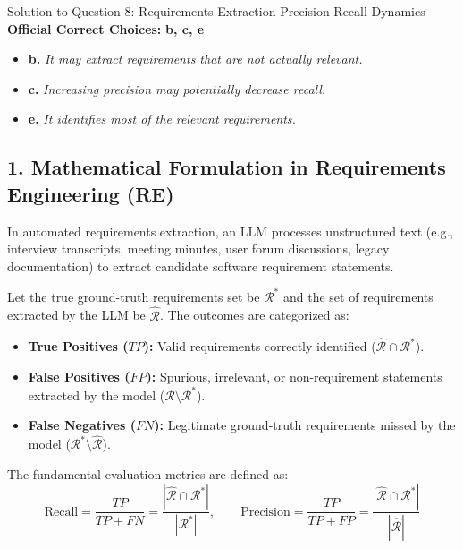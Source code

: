 \documentclass[11pt,a4paper]{article}
\begin{document}
\begin{solutionbox}{Solution to Question 8: Requirements Extraction Precision-Recall Dynamics}
\textbf{Official Correct Choices:} \textbf{b, c, e}
\begin{itemize}[leftmargin=2em,itemsep=1pt]
    \item \textbf{b.} \textit{It may extract requirements that are not actually relevant.}
    \item \textbf{c.} \textit{Increasing precision may potentially decrease recall.}
    \item \textbf{e.} \textit{It identifies most of the relevant requirements.}
\end{itemize}

\medskip
\subsection*{1. Mathematical Formulation in Requirements Engineering (RE)}
In automated requirements extraction, an LLM processes unstructured text (e.g., interview transcripts, meeting minutes, user forum discussions, legacy documentation) to extract candidate software requirement statements.

Let the true ground-truth requirements set be $\mathcal{R}^*$ and the set of requirements extracted by the LLM be $\hat{\mathcal{R}}$. The outcomes are categorized as:
\begin{itemize}[leftmargin=1.5em,itemsep=1pt]
    \item \textbf{True Positives ($TP$):} Valid requirements correctly identified ($\hat{\mathcal{R}} \cap \mathcal{R}^*$).
    \item \textbf{False Positives ($FP$):} Spurious, irrelevant, or non-requirement statements extracted by the model ($\hat{\mathcal{R}} \setminus \mathcal{R}^*$).
    \item \textbf{False Negatives ($FN$):} Legitimate ground-truth requirements missed by the model ($\mathcal{R}^* \setminus \hat{\mathcal{R}}$).
\end{itemize}
The fundamental evaluation metrics are defined as:
\begin{equation}
    \text{Recall} = \frac{TP}{TP + FN} = \frac{|\hat{\mathcal{R}} \cap \mathcal{R}^*|}{|\mathcal{R}^*|}, \qquad
    \text{Precision} = \frac{TP}{TP + FP} = \frac{|\hat{\mathcal{R}} \cap \mathcal{R}^*|}{|\hat{\mathcal{R}}|}
\end{equation}


\end{solutionbox}
\end{document}
